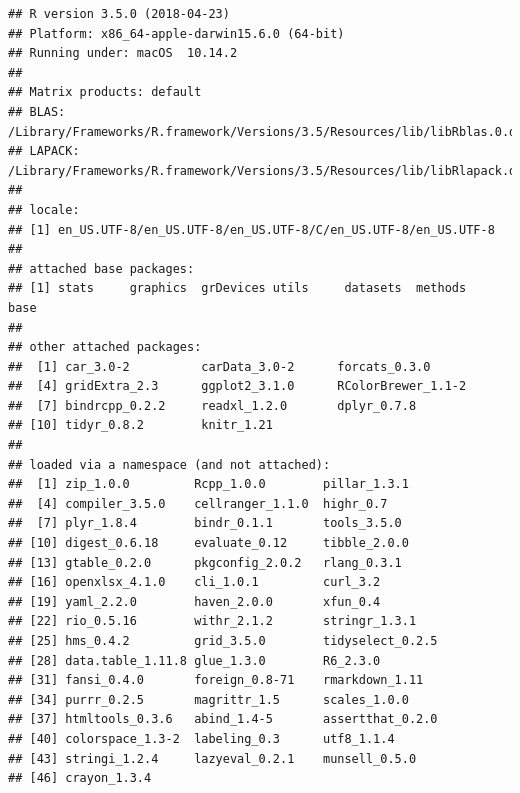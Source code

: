 \documentclass[]{article}
\begin{document}
\begin{verbatim}
## R version 3.5.0 (2018-04-23)
## Platform: x86_64-apple-darwin15.6.0 (64-bit)
## Running under: macOS  10.14.2
## 
## Matrix products: default
## BLAS: /Library/Frameworks/R.framework/Versions/3.5/Resources/lib/libRblas.0.dylib
## LAPACK: /Library/Frameworks/R.framework/Versions/3.5/Resources/lib/libRlapack.dylib
## 
## locale:
## [1] en_US.UTF-8/en_US.UTF-8/en_US.UTF-8/C/en_US.UTF-8/en_US.UTF-8
## 
## attached base packages:
## [1] stats     graphics  grDevices utils     datasets  methods   base     
## 
## other attached packages:
##  [1] car_3.0-2          carData_3.0-2      forcats_0.3.0     
##  [4] gridExtra_2.3      ggplot2_3.1.0      RColorBrewer_1.1-2
##  [7] bindrcpp_0.2.2     readxl_1.2.0       dplyr_0.7.8       
## [10] tidyr_0.8.2        knitr_1.21        
## 
## loaded via a namespace (and not attached):
##  [1] zip_1.0.0         Rcpp_1.0.0        pillar_1.3.1     
##  [4] compiler_3.5.0    cellranger_1.1.0  highr_0.7        
##  [7] plyr_1.8.4        bindr_0.1.1       tools_3.5.0      
## [10] digest_0.6.18     evaluate_0.12     tibble_2.0.0     
## [13] gtable_0.2.0      pkgconfig_2.0.2   rlang_0.3.1      
## [16] openxlsx_4.1.0    cli_1.0.1         curl_3.2         
## [19] yaml_2.2.0        haven_2.0.0       xfun_0.4         
## [22] rio_0.5.16        withr_2.1.2       stringr_1.3.1    
## [25] hms_0.4.2         grid_3.5.0        tidyselect_0.2.5 
## [28] data.table_1.11.8 glue_1.3.0        R6_2.3.0         
## [31] fansi_0.4.0       foreign_0.8-71    rmarkdown_1.11   
## [34] purrr_0.2.5       magrittr_1.5      scales_1.0.0     
## [37] htmltools_0.3.6   abind_1.4-5       assertthat_0.2.0 
## [40] colorspace_1.3-2  labeling_0.3      utf8_1.1.4       
## [43] stringi_1.2.4     lazyeval_0.2.1    munsell_0.5.0    
## [46] crayon_1.3.4
\end{verbatim}
\end{document}

